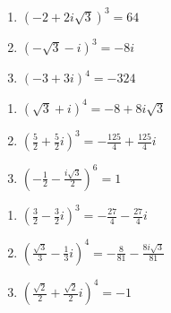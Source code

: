 \documentclass{ximera}
\begin{document}
\begin{multicols}{3}

\begin{enumerate}

\setcounter{enumi}{\value{HW}}

\item $\left(-2 + 2i\sqrt{3}\right)^3 = 64$
\item $(-\sqrt{3} - i)^3 =-8i$
\item $(-3+3i)^{4}=-324$

\setcounter{HW}{\value{enumi}}

\end{enumerate}

\end{multicols}

\begin{multicols}{3}

\begin{enumerate}

\setcounter{enumi}{\value{HW}}

\item $(\sqrt{3} + i)^4 =-8 + 8i\sqrt{3}$ 
\item $\left(\frac{5}{2} + \frac{5}{2} i\right)^3=-\frac{125}{4}+\frac{125}{4} i$ 
\item $\left(-\frac{1}{2} - \frac{i \sqrt{3}}{2}\right)^{6}=1$

\setcounter{HW}{\value{enumi}}

\end{enumerate}

\end{multicols}

\begin{multicols}{3}

\begin{enumerate}

\setcounter{enumi}{\value{HW}}

\item $\left(\frac{3}{2} - \frac{3}{2} i\right)^3=-\frac{27}{4}-\frac{27}{4} i$ 
\item $\left(\frac{\sqrt{3}}{3} - \frac{1}{3} i\right)^4 =-\frac{8}{81} - \frac{8i\sqrt{3}}{81}$
\item $\left(\frac{\sqrt{2}}{2} + \frac{\sqrt{2}}{2} i\right)^4=-1$

\setcounter{HW}{\value{enumi}}

\end{enumerate}

\end{multicols}
\end{document}

